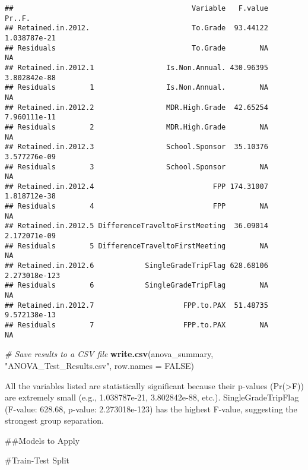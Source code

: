 \documentclass[
]{article}
\newenvironment{Shaded}{\begin{snugshade}}{\end{snugshade}}
\newcommand{\AttributeTok}[1]{\textcolor[rgb]{0.13,0.29,0.53}{#1}}
\newcommand{\CommentTok}[1]{\textcolor[rgb]{0.56,0.35,0.01}{\textit{#1}}}
\newcommand{\ConstantTok}[1]{\textcolor[rgb]{0.56,0.35,0.01}{#1}}
\newcommand{\DecValTok}[1]{\textcolor[rgb]{0.00,0.00,0.81}{#1}}
\newcommand{\FloatTok}[1]{\textcolor[rgb]{0.00,0.00,0.81}{#1}}
\newcommand{\FunctionTok}[1]{\textcolor[rgb]{0.13,0.29,0.53}{\textbf{#1}}}
\newcommand{\NormalTok}[1]{#1}
\newcommand{\OtherTok}[1]{\textcolor[rgb]{0.56,0.35,0.01}{#1}}
\newcommand{\SpecialCharTok}[1]{\textcolor[rgb]{0.81,0.36,0.00}{\textbf{#1}}}
\newcommand{\StringTok}[1]{\textcolor[rgb]{0.31,0.60,0.02}{#1}}
\begin{document}
\begin{verbatim}
##                                          Variable   F.value        Pr..F.
## Retained.in.2012.                        To.Grade  93.44122  1.038787e-21
## Residuals                                To.Grade        NA            NA
## Retained.in.2012.1                 Is.Non.Annual. 430.96395  3.802842e-88
## Residuals        1                 Is.Non.Annual.        NA            NA
## Retained.in.2012.2                 MDR.High.Grade  42.65254  7.960111e-11
## Residuals        2                 MDR.High.Grade        NA            NA
## Retained.in.2012.3                 School.Sponsor  35.10376  3.577276e-09
## Residuals        3                 School.Sponsor        NA            NA
## Retained.in.2012.4                            FPP 174.31007  1.818712e-38
## Residuals        4                            FPP        NA            NA
## Retained.in.2012.5 DifferenceTraveltoFirstMeeting  36.09014  2.172071e-09
## Residuals        5 DifferenceTraveltoFirstMeeting        NA            NA
## Retained.in.2012.6            SingleGradeTripFlag 628.68106 2.273018e-123
## Residuals        6            SingleGradeTripFlag        NA            NA
## Retained.in.2012.7                     FPP.to.PAX  51.48735  9.572138e-13
## Residuals        7                     FPP.to.PAX        NA            NA
\end{verbatim}

\begin{Shaded}
\begin{Highlighting}[]
\CommentTok{\# Save results to a CSV file}
\FunctionTok{write.csv}\NormalTok{(anova\_summary, }\StringTok{"ANOVA\_Test\_Results.csv"}\NormalTok{, }\AttributeTok{row.names =} \ConstantTok{FALSE}\NormalTok{)}
\end{Highlighting}
\end{Shaded}

All the variables listed are statistically significant because their
p-values (Pr(\textgreater F)) are extremely small (e.g., 1.038787e-21,
3.802842e-88, etc.). SingleGradeTripFlag (F-value: 628.68, p-value:
2.273018e-123) has the highest F-value, suggesting the strongest group
separation.

\#\#Models to Apply

\#Train-Test Split

\begin{Shaded}
\end{Shaded}
\end{document}
